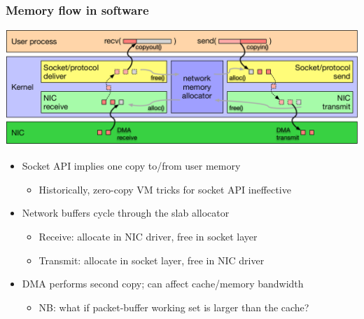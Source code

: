 \begin{frame}
  \frametitle{Memory flow in software}

  \begin{center}
    \includegraphics[width=\textwidth]{../../figures/network-memory-flow.pdf}
  \end{center}

  \pause

  \begin{itemize}
    \item Socket API implies one copy to/from user memory
    \begin{itemize}
      \item Historically, zero-copy VM tricks for socket API ineffective
    \end{itemize}

    \medskip
    \pause

    \item Network buffers cycle through the slab allocator
    \begin{itemize}
      \item Receive: allocate in NIC driver, free in socket layer
      \item Transmit: allocate in socket layer, free in NIC driver
    \end{itemize}

    \medskip
    \pause

    \item DMA performs second copy; can affect cache/memory bandwidth
    \begin{itemize}
      \item NB: what if packet-buffer working set is larger than the cache?
    \end{itemize}
  \end{itemize}
\end{frame}

